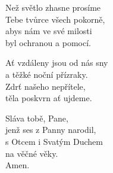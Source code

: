 \begin{translatioMulticol}{3}
Než světlo zhasne prosíme\\
Tebe tvůrce všech pokorně,\\
abys nám ve své milosti\\
byl ochranou a pomocí.\columnbreak

Ať vzdáleny jsou od nás sny\\
a těžké noční přízraky.\\
Zdrť našeho nepřítele,\\
těla poskvrn ať ujdeme.\columnbreak

Sláva tobě, Pane,\\
jenž ses z Panny narodil,\\
s Otcem i Svatým Duchem\\
na věčné věky.\\
Amen.
\end{translatioMulticol}
